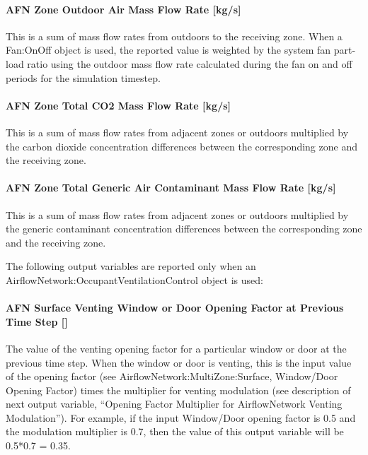 \paragraph{AFN Zone Outdoor Air Mass Flow Rate {[}kg/s{]}}\label{afn-zone-outdoor-air-mass-flow-rate-kgs}

This is a sum of mass flow rates from outdoors to the receiving zone. When a Fan:OnOff object is used, the reported value is weighted by the system fan part-load ratio using the outdoor mass flow rate calculated during the fan on and off periods for the simulation timestep.

\paragraph{AFN Zone Total CO2 Mass Flow Rate {[}kg/s{]}}\label{afn-zone-total-co2-mass-flow-rate-kgs}

This is a sum of mass flow rates from adjacent zones or outdoors multiplied by the carbon dioxide concentration differences between the corresponding zone and the receiving zone.

\paragraph{AFN Zone Total Generic Air Contaminant Mass Flow Rate {[}kg/s{]}}\label{afn-zone-total-generic-air-contaminant-mass-flow-rate-kgs}

This is a sum of mass flow rates from adjacent zones or outdoors multiplied by the generic contaminant concentration differences between the corresponding zone and the receiving zone.

The following output variables are reported only when an AirflowNetwork:OccupantVentilationControl object is used:

\paragraph{AFN Surface Venting Window or Door Opening Factor at Previous Time Step {[]}}\label{afn-surface-venting-window-or-door-opening-factor-at-previous-time-step}

The value of the venting opening factor for a particular window or door at the previous time step. When the window or door is venting, this is the input value of the opening factor (see AirflowNetwork:MultiZone:Surface, Window/Door Opening Factor) times the multiplier for venting modulation (see description of next output variable, ``Opening Factor Multiplier for AirflowNetwork Venting Modulation''). For example, if the input Window/Door opening factor is 0.5 and the modulation multiplier is 0.7, then the value of this output variable will be 0.5*0.7 = 0.35.


